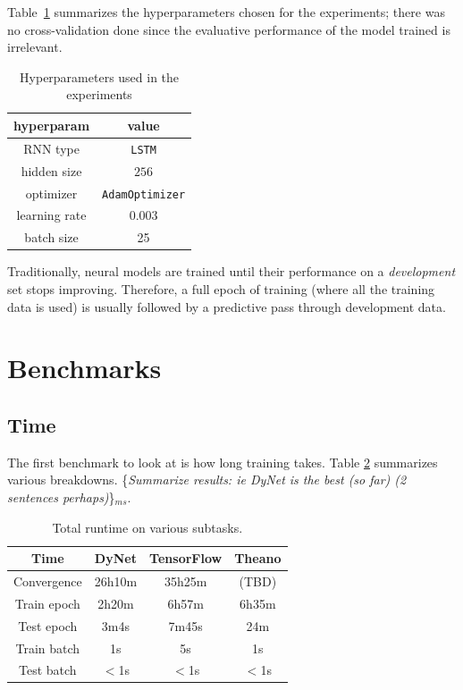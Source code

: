 \documentclass{article}
\newcommand{\ms}[1]{{\color{cyan}\{\textit{#1}\}$_{ms}$}}
\begin{document}
Table~\ref{tab:hyperparams} summarizes the hyperparameters chosen for the experiments; there was no cross-validation done since the evaluative performance of the model trained is irrelevant.
\begin{table}\begin{center}
\begin{tabular}{cc}
\textbf{hyperparam} & \textbf{value} \\\hline
RNN type & \texttt{LSTM} \\
hidden size & $256$ \\
optimizer & \texttt{AdamOptimizer} \\
learning rate & $0.003$ \\
batch size & 25 \\
\end{tabular}
\caption{\label{tab:hyperparams}Hyperparameters used in the experiments}
\end{center}\end{table}

Traditionally, neural models are trained until their performance on a \textit{development} set stops improving. Therefore, a full epoch of training (where all the training data is used) is usually followed by a predictive pass through development data.
\section{Benchmarks}
\label{sec:benchmarks}
\subsection{Time}
The first benchmark to look at is how long training takes. Table \ref{tab:timing} summarizes various breakdowns. \ms{Summarize results: ie DyNet is the best (so far) (2 sentences perhaps)}.
\begin{table}
\begin{tabular}{c|ccc}
Time					& DyNet 		& TensorFlow 	& Theano \\ \hline
Convergence		& 26h10m 		& 35h25m 			& (TBD)\\
Train epoch 		& 2h20m		& 6h57m 			& 6h35m \\
Test epoch 		& 3m4s			& 7m45s 			& 24m \\
Train batch 		& 1s 				& 5s 					& 1s \\
Test batch 			& $<$1s 		& $<$1s 			& $<$1s \\
\end{tabular}
\caption{\label{tab:timing}Total runtime on various subtasks.}
\end{table}
\end{document}
